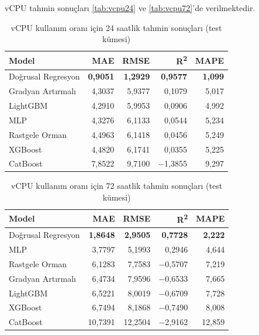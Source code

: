 vCPU tahmin sonuçları \autoref{tab:vcpu24} ve \autoref{tab:vcpu72}'de verilmektedir.

\begin{table}[htbp]
    \centering
    \caption{vCPU kullanım oranı için 24 saatlik tahmin sonuçları (test kümesi)}
    \label{tab:vcpu24}
    \begin{tabular}{lrrrr}
        \textbf{Model} & \textbf{MAE} & \textbf{RMSE} & \textbf{R\textsuperscript{2}} & \textbf{MAPE} \\
        \hline
        Doğrusal Regresyon  & \textbf{0,9051} & \textbf{1,2929} & \textbf{0,9577} & \textbf{1,099} \\
        Gradyan Artırmalı   & 4,3037 & 5,9377 & 0,1079 & 5,017 \\
        LightGBM            & 4,2910 & 5,9953 & 0,0906 & 4,992 \\
        MLP                 & 4,3276 & 6,1133 & 0,0544 & 5,234 \\
        Rastgele Orman      & 4,4963 & 6,1418 & 0,0456 & 5,249 \\
        XGBoost             & 4,4820 & 6,1741 & 0,0355 & 5,225 \\
        CatBoost            & 7,8522 & 9,7100 & $-$1,3855 & 9,297 \\
    \end{tabular}
\end{table}

\begin{table}[htbp]
    \centering
    \caption{vCPU kullanım oranı için 72 saatlik tahmin sonuçları (test kümesi)}
    \label{tab:vcpu72}
    \begin{tabular}{lrrrr}
        \textbf{Model} & \textbf{MAE} & \textbf{RMSE} & \textbf{R\textsuperscript{2}} & \textbf{MAPE} \\
        \hline
        Doğrusal Regresyon  & \textbf{1,8648} & \textbf{2,9505} & \textbf{0,7728} & \textbf{2,222} \\
        MLP                 & 3,7797 & 5,1993 & 0,2946 & 4,644 \\
        Rastgele Orman      & 6,1283 & 7,7583 & $-$0,5707 & 7,219 \\
        Gradyan Artırmalı   & 6,4734 & 7,9596 & $-$0,6533 & 7,665 \\
        LightGBM            & 6,5221 & 8,0019 & $-$0,6709 & 7,728 \\
        XGBoost             & 6,7494 & 8,1868 & $-$0,7490 & 8,008 \\
        CatBoost            & 10,7391 & 12,2504 & $-$2,9162 & 12,859 \\
    \end{tabular}
\end{table}

